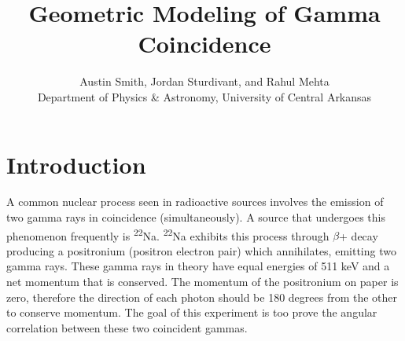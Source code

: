 \documentclass[12pt, letterpaper, twocolumn]{article}
\title{Geometric Modeling of Gamma Coincidence}
\author{Austin Smith, Jordan Sturdivant, and Rahul Mehta\\
Department of Physics \& Astronomy, University of Central Arkansas
}
\date{}
\begin{document}
\maketitle{}
\section{Introduction}
A common nuclear process seen in radioactive sources involves the emission of
two gamma rays in coincidence (simultaneously). A source that undergoes this
phenomenon frequently is \textsuperscript{22}Na. \textsuperscript{22}Na exhibits
this process through $\beta$+ decay producing a positronium (positron electron
pair) which annihilates, emitting two gamma rays. These gamma rays in theory
have equal energies of 511 keV and a net momentum that is conserved. The
momentum of the positronium on paper is zero, therefore the direction of each
photon should be 180 degrees from the other to conserve momentum. The goal of
this experiment is too prove the angular correlation between these two
coincident gammas.
\end{document}
